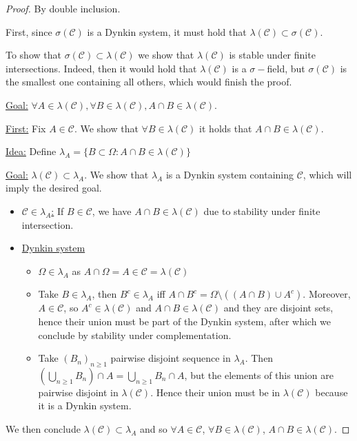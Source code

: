 \documentclass[../main.tex]{subfiles}
\begin{document}
\begin{proof}
  By double inclusion.
  \vspace{0.5em}

  First, since $\sigma(\mathcal{C})$ is a Dynkin system, it must hold that
  $\lambda(\mathcal{C}) \subset \sigma(\mathcal{C})$.
  \vspace{0.5em}

  To show that $\sigma(\mathcal{C}) \subset \lambda(\mathcal{C})$ we show that
  $\lambda(\mathcal{C})$ is stable under finite intersections. Indeed, then it would hold that
  $\lambda(\mathcal{C})$ is a $\sigma-$field, but $\sigma(\mathcal{C})$ is the smallest one
  containing all others, which would finish the proof.

  \vspace{0.5em}

  \underline{Goal:} $\forall A \in \lambda(\mathcal{C}), \forall B \in \lambda(\mathcal{C}), A
  \cap B \in \lambda(\mathcal{C})$.
  \vspace{0.3em}

  \underline{First:} Fix $A \in \mathcal{C}$. We show that $\forall B \in \lambda(\mathcal{C})$
  it holds that $A \cap B \in \lambda(\mathcal{C})$.
  
  \underline{Idea:} Define $\lambda_{A} = \{ B \subset \Omega \colon A \cap B \in \lambda(\mathcal{C})\} $

  \underline{Goal:} $\lambda(\mathcal{C}) \subset \lambda_{A}$.
  We show that $\lambda_{A}$ is a Dynkin system containing $\mathcal{C}$, which will imply the
  desired goal.
  \begin{itemize}
    \item \underline{$\mathcal{C} \in \lambda_{A}$:} If $B \in \mathcal{C}$, we have $A \cap B
      \in \lambda(\mathcal{C})$ due to stability under finite intersection.
    \item \underline{Dynkin system}
      \begin{itemize}
        \item $\Omega \in \lambda_A$ as $A \cap \Omega = A \in \mathcal{C} =
          \lambda(\mathcal{C})$
        \item Take $B \in \lambda_{A}$, then $B^c \in \lambda_{A}$ iff $A \cap B^c = \Omega \setminus \left( (A \cap B)
          \cup A^c \right) $. Moreover, $A \in \mathcal{C}$, so $A^c \in \lambda(\mathcal{C})$
          and $A \cap B \in \lambda(\mathcal{C})$ and they are disjoint sets, hence their union
          must be part of the Dynkin system, after which we conclude by stability under
          complementation.
        \item Take $(B_n)_{n \geq 1}$ pairwise disjoint sequence in $\lambda_A$. Then 
          $\left( \bigcup_{n \geq 1} B_n \right) \cap A = \bigcup_{n \geq 1} B_n \cap A$, but
          the elements of this union are pairwise disjoint in $\lambda(\mathcal{C})$. Hence
          their union must be in $\lambda(\mathcal{C})$ because it is a Dynkin system.
      \end{itemize}
  \end{itemize}
  We then conclude $\lambda(\mathcal{C}) \subset \lambda_{A}$ and so $\forall A \in
  \mathcal{C}$, $\forall B \in \lambda(\mathcal{C})$, $A \cap B \in \lambda(\mathcal{C})$.


\end{proof}
\end{document}
